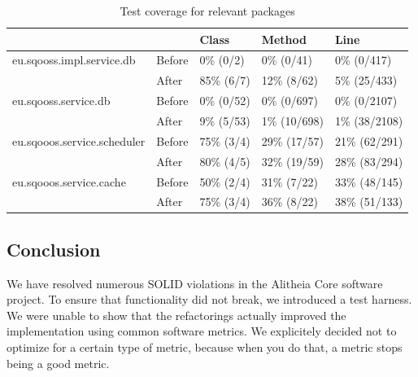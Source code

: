 \documentclass{article}
\begin{document}
\begin{table}[h]
	\centering
    \begin{tabular}{ll|lll}
    ~                           & ~      & Class      & Method       & Line         \\ \hline
    eu.sqooss.impl.service.db   & Before & 0\% (0/2)  & 0\% (0/41)   & 0\% (0/417) \\
    ~                           & After  & 85\% (6/7) & 12\% (8/62)  & 5\% (25/433) \\ \hline
    eu.sqooss.service.db        & Before & 0\% (0/52) & 0\% (0/697)  & 0\% (0/2107) \\
    ~                           & After  & 9\% (5/53) & 1\% (10/698) & 1\% (38/2108) \\ \hline
    eu.sqooos.service.scheduler & Before & 75\% (3/4) & 29\% (17/57) & 21\% (62/291) \\
    ~                           & After  & 80\% (4/5) & 32\% (19/59) & 28\% (83/294) \\ \hline
    eu.sqooos.service.cache     & Before & 50\% (2/4) & 31\% (7/22)  & 33\% (48/145) \\
    ~                           & After  & 75\% (3/4) & 36\% (8/22)  & 38\% (51/133)

    \end{tabular}
    \caption{Test coverage for relevant packages}
    \label{tbl:coverage}
\end{table}

\subsection{Conclusion}
We have resolved numerous SOLID violations in the Alitheia Core software project. To ensure that functionality did not break, we introduced a test harness. We were unable to show that the refactorings actually improved the implementation using common software metrics.
We explicitely decided not to optimize for a certain type of metric, because when you do that, a metric stops being a good metric.


\end{document}
